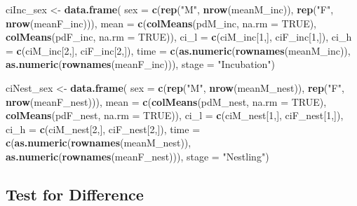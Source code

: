 \documentclass[]{article}
\newenvironment{Shaded}{\begin{snugshade}}{\end{snugshade}}
\newcommand{\DataTypeTok}[1]{\textcolor[rgb]{0.13,0.29,0.53}{#1}}
\newcommand{\DecValTok}[1]{\textcolor[rgb]{0.00,0.00,0.81}{#1}}
\newcommand{\KeywordTok}[1]{\textcolor[rgb]{0.13,0.29,0.53}{\textbf{#1}}}
\newcommand{\NormalTok}[1]{#1}
\newcommand{\OtherTok}[1]{\textcolor[rgb]{0.56,0.35,0.01}{#1}}
\newcommand{\StringTok}[1]{\textcolor[rgb]{0.31,0.60,0.02}{#1}}
\begin{document}
\begin{Shaded}
\begin{Highlighting}[]
\NormalTok{ciInc_sex <-}\StringTok{ }\KeywordTok{data.frame}\NormalTok{(}
    \DataTypeTok{sex =} \KeywordTok{c}\NormalTok{(}\KeywordTok{rep}\NormalTok{(}\StringTok{"M"}\NormalTok{, }\KeywordTok{nrow}\NormalTok{(meanM_inc)), }\KeywordTok{rep}\NormalTok{(}\StringTok{"F"}\NormalTok{, }\KeywordTok{nrow}\NormalTok{(meanF_inc))),}
    \DataTypeTok{mean =} \KeywordTok{c}\NormalTok{(}\KeywordTok{colMeans}\NormalTok{(pdM_inc, }\DataTypeTok{na.rm =} \OtherTok{TRUE}\NormalTok{), }\KeywordTok{colMeans}\NormalTok{(pdF_inc, }\DataTypeTok{na.rm =} \OtherTok{TRUE}\NormalTok{)),}
    \DataTypeTok{ci_l =} \KeywordTok{c}\NormalTok{(ciM_inc[}\DecValTok{1}\NormalTok{,], ciF_inc[}\DecValTok{1}\NormalTok{,]),}
    \DataTypeTok{ci_h =} \KeywordTok{c}\NormalTok{(ciM_inc[}\DecValTok{2}\NormalTok{,], ciF_inc[}\DecValTok{2}\NormalTok{,]),}
    \DataTypeTok{time =} \KeywordTok{c}\NormalTok{(}\KeywordTok{as.numeric}\NormalTok{(}\KeywordTok{rownames}\NormalTok{(meanM_inc)), }\KeywordTok{as.numeric}\NormalTok{(}\KeywordTok{rownames}\NormalTok{(meanF_inc))),}
    \DataTypeTok{stage =} \StringTok{"Incubation"}\NormalTok{)}


\NormalTok{ciNest_sex <-}\StringTok{ }\KeywordTok{data.frame}\NormalTok{(}
    \DataTypeTok{sex =} \KeywordTok{c}\NormalTok{(}\KeywordTok{rep}\NormalTok{(}\StringTok{"M"}\NormalTok{, }\KeywordTok{nrow}\NormalTok{(meanM_nest)), }\KeywordTok{rep}\NormalTok{(}\StringTok{"F"}\NormalTok{, }\KeywordTok{nrow}\NormalTok{(meanF_nest))),}
    \DataTypeTok{mean =} \KeywordTok{c}\NormalTok{(}\KeywordTok{colMeans}\NormalTok{(pdM_nest, }\DataTypeTok{na.rm =} \OtherTok{TRUE}\NormalTok{), }\KeywordTok{colMeans}\NormalTok{(pdF_nest, }\DataTypeTok{na.rm =} \OtherTok{TRUE}\NormalTok{)),}
    \DataTypeTok{ci_l =} \KeywordTok{c}\NormalTok{(ciM_nest[}\DecValTok{1}\NormalTok{,], ciF_nest[}\DecValTok{1}\NormalTok{,]),}
    \DataTypeTok{ci_h =} \KeywordTok{c}\NormalTok{(ciM_nest[}\DecValTok{2}\NormalTok{,], ciF_nest[}\DecValTok{2}\NormalTok{,]),}
    \DataTypeTok{time =} \KeywordTok{c}\NormalTok{(}\KeywordTok{as.numeric}\NormalTok{(}\KeywordTok{rownames}\NormalTok{(meanM_nest)), }\KeywordTok{as.numeric}\NormalTok{(}\KeywordTok{rownames}\NormalTok{(meanF_nest))),}
    \DataTypeTok{stage =} \StringTok{"Nestling"}\NormalTok{)}
\end{Highlighting}
\end{Shaded}

\hypertarget{test-for-difference}{%
\subsection{Test for Difference}\label{test-for-difference}}
\end{document}

